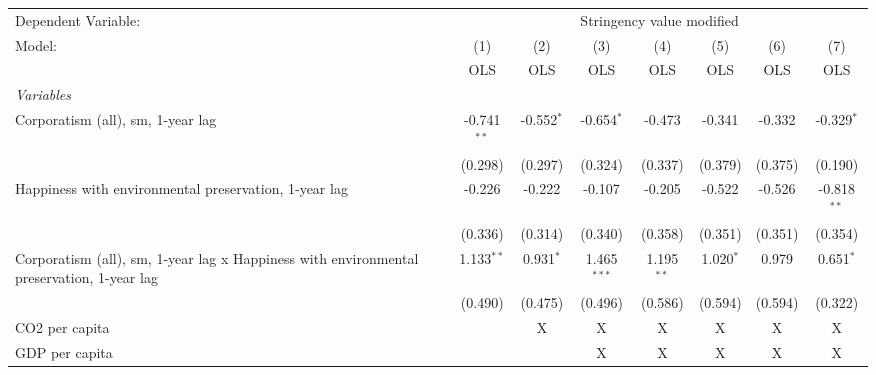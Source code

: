 
\begingroup
\centering
\begin{tabular}{lccccccc}
   \toprule
   Dependent Variable: & \multicolumn{7}{c}{Stringency value modified}\\
   Model:                                                                                    & (1)           & (2)          & (3)           & (4)          & (5)         & (6)     & (7)\\  
                                                                                             &  OLS          & OLS          & OLS           & OLS          & OLS         & OLS     & OLS\\  
   \midrule
   \emph{Variables}\\
   Corporatism (all), sm, 1-year lag                                                         & -0.741$^{**}$ & -0.552$^{*}$ & -0.654$^{*}$  & -0.473       & -0.341      & -0.332  & -0.329$^{*}$\\   
                                                                                             & (0.298)       & (0.297)      & (0.324)       & (0.337)      & (0.379)     & (0.375) & (0.190)\\   
   Happiness with environmental preservation, 1-year lag                                     & -0.226        & -0.222       & -0.107        & -0.205       & -0.522      & -0.526  & -0.818$^{**}$\\   
                                                                                             & (0.336)       & (0.314)      & (0.340)       & (0.358)      & (0.351)     & (0.351) & (0.354)\\   
   Corporatism (all), sm, 1-year lag x Happiness with environmental preservation, 1-year lag & 1.133$^{**}$  & 0.931$^{*}$  & 1.465$^{***}$ & 1.195$^{**}$ & 1.020$^{*}$ & 0.979   & 0.651$^{*}$\\   
                                                                                             & (0.490)       & (0.475)      & (0.496)       & (0.586)      & (0.594)     & (0.594) & (0.322)\\   
   CO2 per capita                                                                            &               & X            & X             & X            & X           & X       & X\\  
   GDP per capita                                                                            &               &              & X             & X            & X           & X       & X\\  

\end{tabular}
